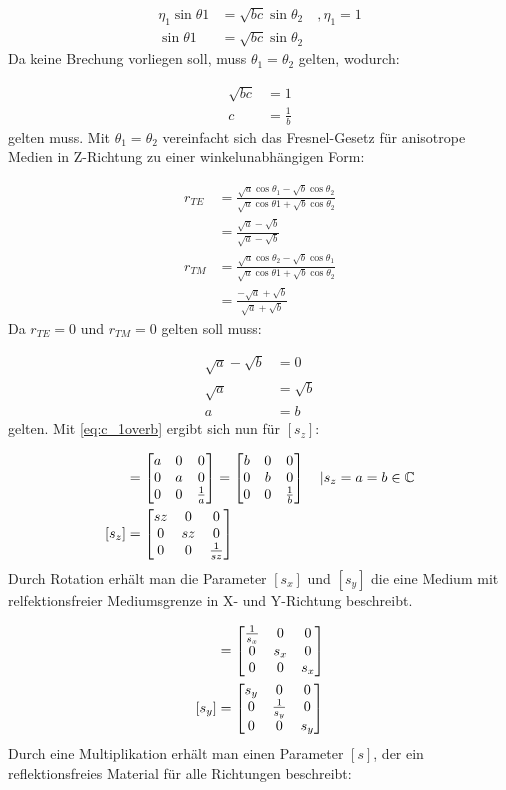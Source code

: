 \documentclass[11pt, ngerman]{article}
\begin{document}
\begin{align}
	\eta_1\sin\theta1 &= \sqrt{bc}\sin\theta_2\quad, \eta_1 = 1\\
	\sin\theta1 &= \sqrt{bc}\sin\theta_2
\end{align}
Da keine Brechung vorliegen soll, muss \(\theta_1 = \theta_2\) gelten, wodurch:

\begin{align}
	\sqrt{bc} &= 1\\
	c &= \frac{1}{b}
	\label{eq:c_1overb}
\end{align}
\newpage
\noindent gelten muss. Mit \(\theta_1 = \theta_2\) vereinfacht sich das Fresnel-Gesetz f\"ur anisotrope Medien in Z-Richtung
zu einer winkelunabh\"angigen Form:

\begin{align}
	r_{TE} &= \frac{\sqrt{a}\cos\theta_1 - \sqrt{b}\cos\theta_2}{\sqrt{a}\cos\theta1 + \sqrt{b}\cos\theta_2}\\
	&= \frac{\sqrt{a} - \sqrt{b}}{\sqrt{a} - \sqrt{b}} \\
	r_{TM} &= \frac{\sqrt{a}\cos\theta_2 - \sqrt{b}\cos\theta_1}{\sqrt{a}\cos\theta1 + \sqrt{b}\cos\theta_2}\\
	&= \frac{-\sqrt{a} + \sqrt{b}}{\sqrt{a} + \sqrt{b}}
\end{align}
Da \(r_{TE} = 0\) und \(r_{TM} = 0\) gelten soll muss:

\begin{align}
	\sqrt{a} - \sqrt{b} &= 0\\
	\sqrt{a} &= \sqrt{b} \\
	a &= b
\end{align}
gelten. Mit \cref{eq:c_1overb} ergibt sich nun f\"ur \([s_z]\):

\begin{align}
	[s_z] &= \dt{a}{a}{\frac{1}{a}} = \dt{b}{b}{\frac{1}{b}}\quad\vert s_z = a = b \in \mathbb{C}\\
	[s_z] &= \dt{sz}{sz}{\frac{1}{sz}}
\end{align}
\newpage
\noindent Durch Rotation erh\"alt man die Parameter \([s_x]\) und \([s_y]\) die eine Medium mit relfektionsfreier
Mediumsgrenze in X- und Y-Richtung beschreibt.

\begin{align}
	[s_x] &= \dt{\frac{1}{s_x}}{s_x}{s_x}\\
	[s_y] &= \dt{s_y}{\frac{1}{s_y}}{s_y}
\end{align}
Durch eine Multiplikation erh\"alt man einen Parameter \([s]\), der ein reflektionsfreies Material f\"ur
alle Richtungen beschreibt:
\end{document}
